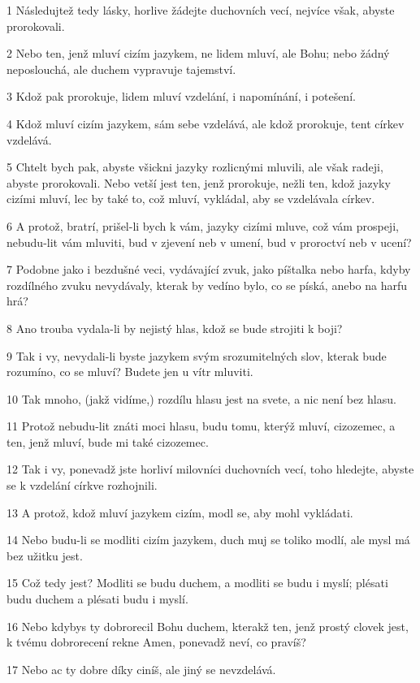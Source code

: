 \par 1 Následujtež tedy lásky, horlive žádejte duchovních vecí, nejvíce však, abyste prorokovali.
\par 2 Nebo ten, jenž mluví cizím jazykem, ne lidem mluví, ale Bohu; nebo žádný neposlouchá, ale duchem vypravuje tajemství.
\par 3 Kdož pak prorokuje, lidem mluví vzdelání, i napomínání, i potešení.
\par 4 Kdož mluví cizím jazykem, sám sebe vzdelává, ale kdož prorokuje, tent církev vzdelává.
\par 5 Chtelt bych pak, abyste všickni jazyky rozlicnými mluvili, ale však radeji, abyste prorokovali. Nebo vetší jest ten, jenž prorokuje, nežli ten, kdož jazyky cizími mluví, lec by také to, což mluví, vykládal, aby se vzdelávala církev.
\par 6 A protož, bratrí, prišel-li bych k vám, jazyky cizími mluve, což vám prospeji, nebudu-lit vám mluviti, bud v zjevení neb v umení, bud v proroctví neb v ucení?
\par 7 Podobne jako i bezdušné veci, vydávající zvuk, jako píštalka nebo harfa, kdyby rozdílného zvuku nevydávaly, kterak by vedíno bylo, co se píská, anebo na harfu hrá?
\par 8 Ano trouba vydala-li by nejistý hlas, kdož se bude strojiti k boji?
\par 9 Tak i vy, nevydali-li byste jazykem svým srozumitelných slov, kterak bude rozumíno, co se mluví? Budete jen u vítr mluviti.
\par 10 Tak mnoho, (jakž vidíme,) rozdílu hlasu jest na svete, a nic není bez hlasu.
\par 11 Protož nebudu-lit znáti moci hlasu, budu tomu, kterýž mluví, cizozemec, a ten, jenž mluví, bude mi také cizozemec.
\par 12 Tak i vy, ponevadž jste horliví milovníci duchovních vecí, toho hledejte, abyste se k vzdelání církve rozhojnili.
\par 13 A protož, kdož mluví jazykem cizím, modl se, aby mohl vykládati.
\par 14 Nebo budu-li se modliti cizím jazykem, duch muj se toliko modlí, ale mysl má bez užitku jest.
\par 15 Což tedy jest? Modliti se budu duchem, a modliti se budu i myslí; plésati budu duchem a plésati budu i myslí.
\par 16 Nebo kdybys ty dobrorecil Bohu duchem, kterakž ten, jenž prostý clovek jest, k tvému dobrorecení rekne Amen, ponevadž neví, co pravíš?
\par 17 Nebo ac ty dobre díky ciníš, ale jiný se nevzdelává.
